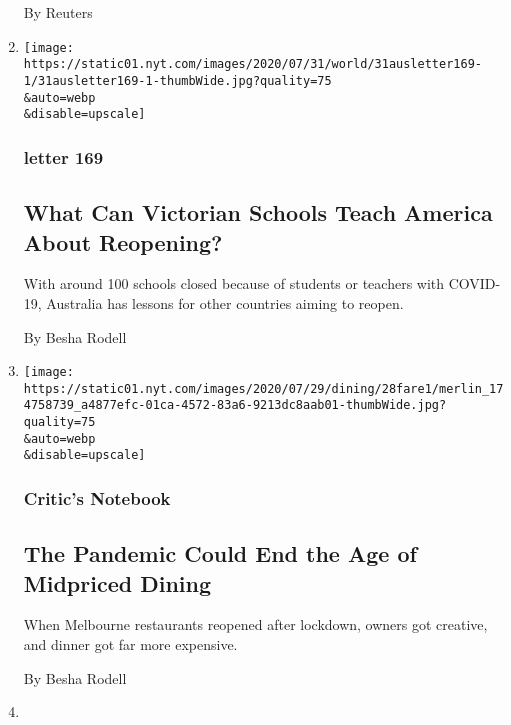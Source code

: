 \begin{enumerate}
  By Reuters
\item
  \href{/2020/07/30/world/australia/melbourne-schools-lessons-america.html}{}

  \texttt{[image: https://static01.nyt.com/images/2020/07/31/world/31ausletter169-1/31ausletter169-1-thumbWide.jpg?quality=75\\\&auto=webp\\\&disable=upscale]}

  \hypertarget{letter-169}{%
  \subsubsection{letter 169}\label{letter-169}}

  \hypertarget{what-can-victorian-schools-teach-america-about-reopening}{%
  \subsection{What Can Victorian Schools Teach America About
  Reopening?}\label{what-can-victorian-schools-teach-america-about-reopening}}

  With around 100 schools closed because of students or teachers with
  COVID-19, Australia has lessons for other countries aiming to reopen.

  By Besha Rodell
\item
  \href{/2020/07/28/dining/melbourne-restaurants-coronavirus.html}{}

  \texttt{[image: https://static01.nyt.com/images/2020/07/29/dining/28fare1/merlin\_174758739\_a4877efc-01ca-4572-83a6-9213dc8aab01-thumbWide.jpg?quality=75\\\&auto=webp\\\&disable=upscale]}

  \hypertarget{critics-notebook}{%
  \subsubsection{Critic's Notebook}\label{critics-notebook}}

  \hypertarget{the-pandemic-could-end-the-age-of-midpriced-dining}{%
  \subsection{The Pandemic Could End the Age of Midpriced
  Dining}\label{the-pandemic-could-end-the-age-of-midpriced-dining}}

  When Melbourne restaurants reopened after lockdown, owners got
  creative, and dinner got far more expensive.

  By Besha Rodell
\item
  \href{/2020/07/28/world/europe/british-australian-academic-jail-iran-qarchak.html}{}


\end{enumerate}
